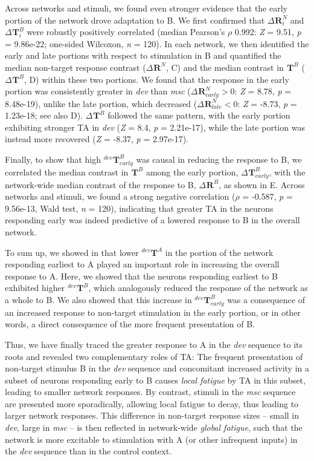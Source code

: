 \documentclass[9pt,lineno,onehalfspacing]{elife}
\newcommand{\dev}{\textit{dev}}
\newcommand{\msc}{\textit{msc}}
\newcommand{\R}[3][]{{}^{#1}_{}\boldsymbol R^{#2}_{#3}}
\newcommand{\T}[3][]{{}^{#1}_{}\boldsymbol T^{#2}_{#3}}
\begin{document}
Across networks and stimuli, we found even stronger evidence that the early portion of the network drove adaptation to B. We first confirmed that $\Delta \R{N}{i}$ and $\Delta \T{B}{i}$ were robustly positively correlated (median Pearson's $\rho$ 0.992: \textit{Z} = 9.51, \textit{p} = 9.86e-22; one-sided Wilcoxon, \textit{n} = 120). In each network, we then identified the early and late portions with respect to stimulation in B and quantified the median non-target response contrast ($\Delta \R{N}{}$, C) and the median contrast in $\T{B}{}$ ($\Delta \T{B}{}$, D) within these two portions. We found that the response in the early portion was consistently greater in \dev{} than \msc{} ($\Delta \R{N}{early} > 0$: \textit{Z} = 8.78, \textit{p} = 8.48e-19), unlike the late portion, which decreased ($\Delta \R{N}{late} < 0$: \textit{Z} = -8.73, \textit{p} = 1.23e-18; see also D). $\Delta \T{B}{}$ followed the same pattern, with the early portion exhibiting stronger TA in \dev{} (\textit{Z} = 8.4, \textit{p} = 2.21e-17), while the late portion was instead more recovered (\textit{Z} = -8.37, \textit{p} = 2.97e-17).

Finally, to show that high $\T[dev]{B}{early}$ was causal in reducing the response to B, we correlated the median contrast in $\T{B}{}$ among the early portion, $\Delta \T{B}{early}$, with the network-wide median contrast of the response to B, $\Delta \R{B}{}$, as shown in E. Across networks and stimuli, we found a strong negative correlation ($\rho$ = -0.587, \textit{p} = 9.56e-13, Wald test, \textit{n} = 120), indicating that greater TA in the neurons responding early was indeed predictive of a lowered response to B in the overall network.

To sum up, we showed in  that lower $\T[dev]{A}{}$ in the portion of the network responding earliest to A played an important role in increasing the overall response to A. Here, we showed that the neurons responding earliest to B exhibited higher $\T[dev]{B}{}$, which analogously reduced the response of the network as a whole to B. We also showed that this increase in $\T[dev]{B}{early}$ was a consequence of an increased response to non-target stimulation in the early portion, or in other words, a direct consequence of the more frequent presentation of B.

Thus, we have finally traced the greater response to A in the \dev{} sequence to its roots and revealed two complementary roles of TA: The frequent presentation of non-target stimulus B in the \dev{} sequence and concomitant increased activity in a subset of neurons responding early to B causes \emph{local fatigue} by TA in this subset, leading to smaller network responses. By contrast, stimuli in the \msc{} sequence are presented more sporadically, allowing local fatigue to decay, thus leading to larger network responses. This difference in non-target response sizes -- small in \dev{}, large in \msc{} -- is then reflected in network-wide \emph{global fatigue}, such that the network is more excitable to stimulation with A (or other infrequent inputs) in the \dev{} sequence than in the control context.
\end{document}
